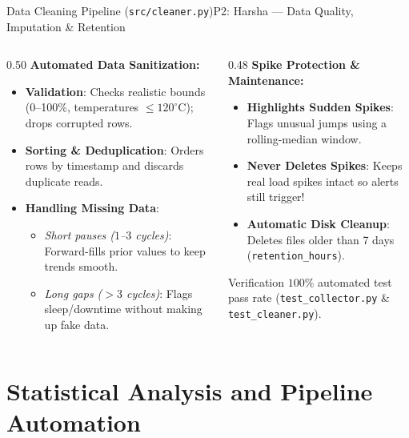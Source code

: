 \documentclass[aspectratio=169,10pt]{beamer}
\begin{document}
\begin{frame}{Data Cleaning Pipeline (\texttt{src/cleaner.py})}{P2: Harsha --- Data Quality, Imputation \& Retention}
\begin{columns}[T]
\begin{column}{0.50\textwidth}
\textbf{Automated Data Sanitization:}
\begin{itemize}
    \item \textbf{Validation}: Checks realistic bounds (0--100\%, temperatures $\le 120^\circ\text{C}$); drops corrupted rows.
    \item \textbf{Sorting \& Deduplication}: Orders rows by timestamp and discards duplicate reads.
    \item \textbf{Handling Missing Data}:
    \begin{itemize}
        \item \emph{Short pauses ($1$--$3$ cycles)}: Forward-fills prior values to keep trends smooth.
        \item \emph{Long gaps ($>3$ cycles)}: Flags sleep/downtime without making up fake data.
    \end{itemize}
\end{itemize}
\end{column}

\begin{column}{0.48\textwidth}
\textbf{Spike Protection \& Maintenance:}
\begin{itemize}
    \item \textbf{Highlights Sudden Spikes}: Flags unusual jumps using a rolling-median window.
    \item \textbf{Never Deletes Spikes}: Keeps real load spikes intact so alerts still trigger!
    \item \textbf{Automatic Disk Cleanup}: Deletes files older than 7 days (\texttt{retention\_hours}).
\end{itemize}

\vspace{0.3em}
\begin{block}{Verification}
$100\%$ automated test pass rate (\texttt{test\_collector.py} \& \texttt{test\_cleaner.py}).
\end{block}
\end{column}
\end{columns}
\end{frame}

\section{Statistical Analysis and Pipeline Automation}
\end{document}
